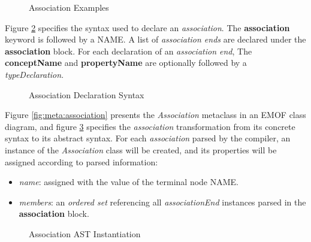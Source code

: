 \begin{figure}
\verbatimfont{\small}

\caption{Association Examples}
\label{fig:ex:associations}
\end{figure}

\begin{concrete-syntax}
Figure \ref{fig:stx:association} specifies the syntax used
to declare an \emph{association}.
The \textbf{association} keyword is followed by a NAME.
A list of \emph{association ends} are declared under the \textbf{association} block.
For each declaration of an \emph{association end},
The \textbf{conceptName} and \textbf{propertyName} are optionally followed by a \emph{typeDeclaration}.
\end{concrete-syntax}

\begin{figure}
\verbatimfont{\small}

\caption{Association Declaration Syntax}
\label{fig:stx:association}
\end{figure}

\begin{abstract-syntax}
Figure \ref{fig:meta:association} presents the \emph{Association} metaclass
in an EMOF \cite{mof} class diagram,
and figure \ref{fig:ast:association} specifies
the \emph{association} transformation
from its concrete syntax to its abstract syntax.
For each \emph{association} parsed by the compiler,
an instance of the \emph{Association} class will be created,
and its properties will be assigned
according to parsed information:

\begin{itemize}

\item \emph{name}:
assigned with the value of the terminal node NAME.

\item \emph{members}:
an \emph{ordered set} referencing all \emph{associationEnd}
instances parsed in the \textbf{association} block.

\end{itemize}
\end{abstract-syntax}

\begin{figure}
\verbatimfont{\small}

\caption{Association AST Instantiation}
\label{fig:ast:association}
\end{figure}
